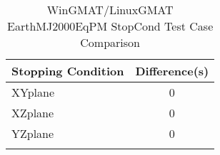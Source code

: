 \begin{table}[htbp!]
\centering
\caption{ WinGMAT/LinuxGMAT EarthMJ2000EqPM StopCond Test Case Comparison}
      \begin{tabular}{lc}
      \hline\hline
          Stopping Condition & Difference(s) \\
         \hline
         XYplane & 0 \\
         XZplane & 0 \\
         YZplane & 0 \\
      \hline\hline
      \label{Table: WinGMAT-LinuxGMAT EarthMJ2000EqPM StopCond Table} 
\end{tabular}
\end{table}
